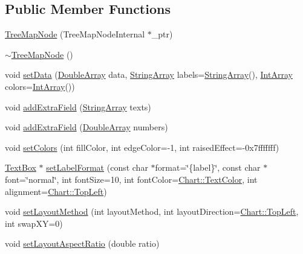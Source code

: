 \subsection*{Public Member Functions}
\begin{DoxyCompactItemize}
\item 
\hyperlink{class_tree_map_node_ab507506bfc51ba9e0727056bae4f0b98}{Tree\+Map\+Node} (Tree\+Map\+Node\+Internal $\ast$\+\_\+ptr)
\item 
\hyperlink{class_tree_map_node_a4935e0ca788e9111871414766f3c3218}{$\sim$\+Tree\+Map\+Node} ()
\item 
void \hyperlink{class_tree_map_node_a528e9fc0b6dc1a860a48a28eb399621d}{set\+Data} (\hyperlink{class_double_array}{Double\+Array} data, \hyperlink{class_string_array}{String\+Array} labels=\hyperlink{class_string_array}{String\+Array}(), \hyperlink{class_int_array}{Int\+Array} colors=\hyperlink{class_int_array}{Int\+Array}())
\item 
void \hyperlink{class_tree_map_node_a865359bf017ab7cf88a8262eb874b042}{add\+Extra\+Field} (\hyperlink{class_string_array}{String\+Array} texts)
\item 
void \hyperlink{class_tree_map_node_a6ab6da145b81186f5ac8c756e100ec3b}{add\+Extra\+Field} (\hyperlink{class_double_array}{Double\+Array} numbers)
\item 
void \hyperlink{class_tree_map_node_a63211696a930a3e71bb36b1b8da09ed7}{set\+Colors} (int fill\+Color, int edge\+Color=-\/1, int raised\+Effect=-\/0x7fffffff)
\item 
\hyperlink{class_text_box}{Text\+Box} $\ast$ \hyperlink{class_tree_map_node_ae8ca68707b6ed67384a109d8058a2c97}{set\+Label\+Format} (const char $\ast$format=\char`\"{}\{label\}\char`\"{}, const char $\ast$font=\char`\"{}normal\char`\"{}, int font\+Size=10, int font\+Color=\hyperlink{namespace_chart_abee0d882fdc9ad0b001245ad9fc64011a879e14f2f5024caccc047374342321ef}{Chart\+::\+Text\+Color}, int alignment=\hyperlink{namespace_chart_ae222e51ce11a254450b6ddfbc862680aa0bf92d1d2d6713aa62e92b86b9a8532f}{Chart\+::\+Top\+Left})
\item 
void \hyperlink{class_tree_map_node_a658ae0fc093692e501c1d6a4a18c7c74}{set\+Layout\+Method} (int layout\+Method, int layout\+Direction=\hyperlink{namespace_chart_ae222e51ce11a254450b6ddfbc862680aa0bf92d1d2d6713aa62e92b86b9a8532f}{Chart\+::\+Top\+Left}, int swap\+XY=0)
\item 
void \hyperlink{class_tree_map_node_a2351ae24b11c4a590090ee607c302c4f}{set\+Layout\+Aspect\+Ratio} (double ratio)
\item 

\end{DoxyCompactItemize}
